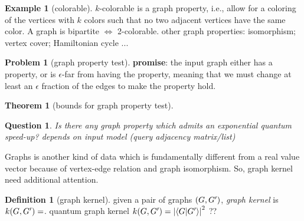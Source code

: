 \documentclass[
10pt,
aps,
pra,
linenumbers,
floatfix,
]{revtex4-2}
\theoremstyle{plain}
\newtheorem{theorem}{Theorem}
\newtheorem{question}{Question}
\theoremstyle{definition}
\newtheorem{definition}{Definition}
\newtheorem{example}{Example}
\newtheorem{problem}{Problem}
\newcommand{\kernel}{k}
\begin{document}
\begin{example}[colorable]\label{exm:colorable}
	$k$-colorable is a graph property, i.e., allow for a coloring of the vertices with $k$ colors such that no two adjacent vertices have the same color.
	A graph is bipartite $\iff$ 2-colorable.
	other graph properties: isomorphism; vertex cover; Hamiltonian cycle ...
\end{example}
\begin{problem}[graph property test]\label{prm:graph_property_test}
	\textbf{promise}: the input graph either has a property, or is $\epsilon$-far from having the property, meaning that we must change at least an $\epsilon$ fraction of the edges to make the property hold.
\end{problem}
\begin{theorem}[bounds for graph property test]
\end{theorem}
\begin{question}
	\cite{montanaroSurveyQuantumProperty2018}
	Is there any graph property which admits an exponential quantum speed-up?
	\cite{ben-davidSymmetriesGraphProperties2020}
	depends on input model (query adjacency matrix/list)
\end{question}
Graphs is another kind of data which is fundamentally different from a real value vector because of vertex-edge relation and graph isomorphism.
So, graph kernel \cite{kriegeSurveyGraphKernels2020} need additional attention.
\begin{definition}[graph kernel]\label{def:graph_kernel}
	given a pair of graphs $(G,G')$,
	\emph{graph kernel} is $\kernel (\graph,\graph')  =$.
	quantum graph kernel $\kernel (\graph,\graph')  = \abs{\ip{\graph}{\graph'}}^2$ ??
	\cite{baiQuantumJensenShannon2015}	
\end{definition}
\end{document}
